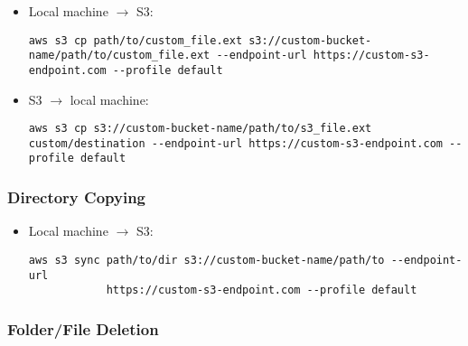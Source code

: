 \documentclass[12pt, a4paper]{article}
\numberwithin{equation}{section}
\theoremstyle{definition}
\theoremstyle{definition}
\begin{document}
	\begin{itemize}
		\item Local machine $\longrightarrow$ S3:
		
		\begin{lstlisting}[style=mystylebash, label=alg:aws__file_copying_local_s3, xleftmargin=\parindent]
			aws s3 cp path/to/custom_file.ext s3://custom-bucket-name/path/to/custom_file.ext --endpoint-url https://custom-s3-endpoint.com --profile default
		\end{lstlisting}	
		
		\item S3 $\longrightarrow$ local machine:
		
		\begin{lstlisting}[style=mystylebash, label=alg:aws__file_copying_s3_local, xleftmargin=\parindent]
			aws s3 cp s3://custom-bucket-name/path/to/s3_file.ext custom/destination --endpoint-url https://custom-s3-endpoint.com --profile default
		\end{lstlisting}	
	\end{itemize}

	\subsubsection{Directory Copying}
	
	\begin{itemize}
		\item Local machine $\longrightarrow$ S3:
		
		\begin{lstlisting}[style=mystylebash, label=alg:aws__dir_copying, xleftmargin=\parindent]
			aws s3 sync path/to/dir s3://custom-bucket-name/path/to --endpoint-url      
			https://custom-s3-endpoint.com --profile default
		\end{lstlisting}
		
	\end{itemize}

	\subsubsection{Folder/File Deletion}
	
\end{document}
